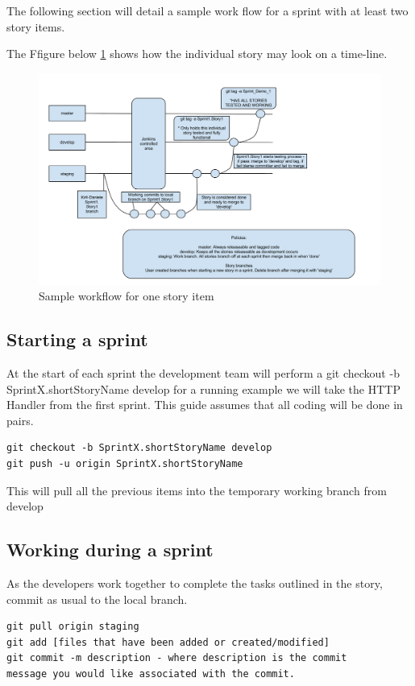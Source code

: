 The following section will detail a sample work flow for a sprint with at least two story items. 

The Ffigure below \ref{fig:architecture} shows how the individual story may look on a time-line.
\begin{figure}[htb]
\centering
\includegraphics[width=1\textwidth]{img/workflow}
\caption{Sample workflow for one story item}
\label{fig:architecture}
\end{figure}


\subsection{Starting a sprint}

\label{gitworkflow}
At the start of each sprint the development team will perform a git checkout -b SprintX.shortStoryName develop
for a running example we will take the HTTP Handler from the first sprint. This guide assumes that all coding will be done in pairs.
\begin{verbatim}
git checkout -b SprintX.shortStoryName develop
git push -u origin SprintX.shortStoryName
\end{verbatim}
This will pull all the previous items into the temporary working branch from develop

\subsection{Working during a sprint}

As the developers work together to complete the tasks outlined in the story, commit as usual to the local branch.\\
\begin{verbatim}
git pull origin staging
git add [files that have been added or created/modified]
git commit -m description - where description is the commit 
message you would like associated with the commit. 
\end{verbatim}
